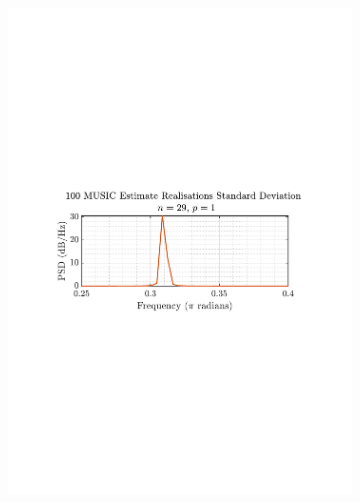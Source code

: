 \documentclass[12pt]{article}
\numberwithin{equation}{section}
\begin{document}
\begin{figure}[H]
\begin{subfigure}{0.49\textwidth}
			\includegraphics[trim={2.2cm 11cm 3.15cm  11.2cm}, clip, width=\textwidth]{../MATLAB/figures/q1_3e_fig02.pdf} 
		\end{subfigure}
		\begin{subfigure}{0.49\textwidth}
			\centering

\end{subfigure}
\end{figure}
\end{document}
